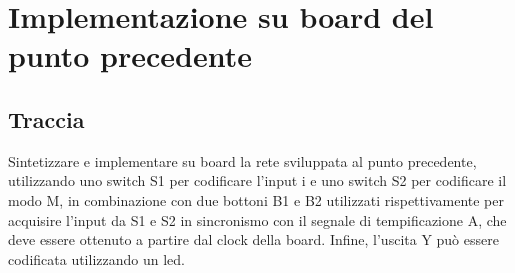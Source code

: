 
\section{Implementazione su board del punto precedente}
\subsection{Traccia}
 Sintetizzare e implementare su board la rete sviluppata al punto precedente, utilizzando uno switch S1 per codificare l’input i e uno switch S2 per codificare il modo M, in combinazione con due bottoni B1 e B2 utilizzati rispettivamente per acquisire l’input da S1 e S2 in sincronismo con il segnale di tempificazione A, che 
deve essere ottenuto a partire dal clock della board. Infine, l’uscita Y può essere codificata utilizzando un led.
